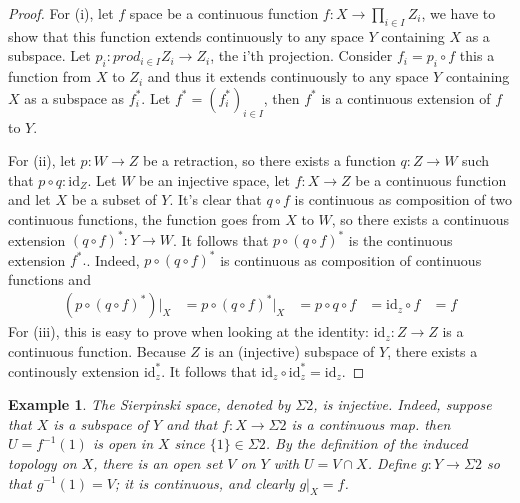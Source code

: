 \documentclass[a4paper,12pt]{article}
\newtheorem{example}[theorem]{Example}
\begin{document}
\begin{proof}\label{commproof}For (i), let $f$ space be a continuous function $f: X \to \prod_{i\in I}Z_i$, we have to show that this function extends continuously to any space $Y$ containing $X$ as a subspace. Let $p_i: prod_{i\in I}Z_i \to Z_i$, the i'th projection. Consider $f_i = p_i \circ f$ this a function from $X$ to $Z_i$ and thus it extends continuously to any space $Y$ containing $X$ as a subspace as $f_i^*$. Let $f^* = (f_i^*)_{i\in I}$, then $f^*$ is a continuous extension of $f$ to $Y$.

  \begin{center}
\end{center}
For (ii), let $p: W \to Z$ be a retraction, so there exists a function $q: Z\to W$ such that $ p\circ q: \text{id}_Z$.  Let $W$ be an injective space, let $f: X \to Z$ be a continuous function and let $X$ be a subset of $Y$. It's clear that $q \circ f$ is continuous as composition of two continuous functions, the function goes from $X$ to $W$, so there exists a continuous extension $(q\circ f)^*: Y \to W$. It follows that $p\circ(q\circ f)^*$ is the continuous extension $f^*.$. Indeed, $p\circ(q\circ f)^*$ is continuous as composition of continuous functions and 
\begin{align*}
(p \circ(q \circ f)^*)|_X &=  p \circ(q \circ f)^*|_X
& = p \circ q \circ f
& = \text{id}_z \circ f
& = f
\end{align*}
For (iii), this is easy to prove when looking at the identity: $\text{id}_z: Z \to Z$ is a continuous function. Because $Z$ is an (injective) subspace of $Y$, there exists a continously extension $\text{id}_z^*$. It follows that $\text{id}_z \circ \text{id}_z^* = \text{id}_z$.
\end{proof}

\begin{example}The Sierpinski space, denoted by $\Sigma 2$, is injective. Indeed, suppose that $X$ is a subspace of $Y$ and that $f: X \to \Sigma 2$ is a continuous map. then $U = f^{-1}(1)$ is open in $X$ since $\{1\} \in \Sigma 2$. By the definition of the induced topology on $X$, there is an open set $V$ on $Y$ with $U = V \cap X$. Define $g: Y \to \Sigma 2$ so that $g^{-1}(1) = V$; it is continuous, and clearly $g|_X = f$.
\end{example}
\end{document}
